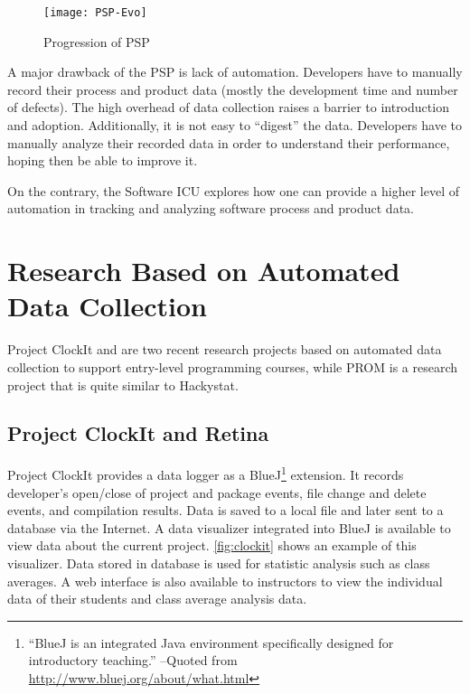 \begin{figure}[htbp] %
   \centering
   \texttt{[image: PSP-Evo]} 
   \caption{Progression of PSP}
   \label{fig:PSP-Evo}
\end{figure}


A major drawback of the PSP is lack of automation. Developers have to manually record their process and product data (mostly the development time and number of defects). The high overhead of data collection raises a barrier to introduction and adoption. Additionally, it is not easy to ``digest'' the data. Developers have to manually analyze their recorded data in order to understand their performance, hoping then be able to improve it.

On the contrary, the Software ICU explores how one can provide a higher level of automation in tracking and analyzing software process and product data.


\section {Research Based on Automated Data Collection}
\label{prom}
Project ClockIt and are two recent research projects based on automated data collection to support entry-level programming courses, while PROM is a research project that is quite similar to Hackystat\cite{prom03}.

\subsection {Project ClockIt and Retina}
Project ClockIt provides a data logger as a BlueJ\footnote{``BlueJ is an integrated Java environment specifically designed for introductory teaching.'' --Quoted from \url{http://www.bluej.org/about/what.html}} extension. It records developer's open/close of project and package events, file change and delete events, and compilation results. Data is saved to a local file and later sent to a database via the Internet. A data visualizer integrated into BlueJ is available to view data about the current project. \autoref{fig:clockit} shows an example of this visualizer. Data stored in database is used for statistic analysis such as class averages. A web interface is also available to instructors to view the individual data of their students and class average analysis data.

